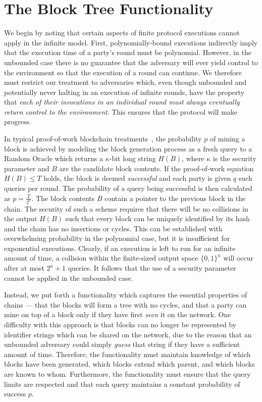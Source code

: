 \section{The Block Tree Functionality}\label{sec.functionality}

We begin by noting that certain aspects of finite protocol executions cannot
apply in the infinite model. First, polynomially-bound executions indirectly
imply that the execution time of a party's round must be polynomial. However, in
the unbounded case there is no guarantee that the adversary will ever yield
control to the environment so that the execution of a round can continue. We
therefore must restrict our treatment to adversaries which, even though
unbounded and potentially never halting in an execution of infinite rounds, have
the property that \emph{each of their invocations in an individual round must
always eventually return control to the environment}. This ensures that the
protocol will make progress.

In typical proof-of-work blockchain treatments~\cite{EC:GarKiaLeo15}, the
probability $p$ of mining a block is achieved by modeling the block generation
process as a fresh query to a Random Oracle which returns a $\kappa$-bit
long string $H(B)$, where $\kappa$ is the security parameter and $B$ are the
candidate block contents. If the proof-of-work equation $H(B) \leq T$ holds, the
block is deemed \emph{successful} and each party is given $q$ such queries per
round. The probability of a query being successful is then calculated as $p =
\frac{T}{2^\kappa}$. The block contents $B$ contain a pointer to the previous
block in the chain. The security of such a scheme requires that there will be
no collisions in the output $H(B)$ such that every block can be uniquely
identified by its hash and the chain has no insertions or cycles. This can be
established with overwhelming probability in the polynomial case, but it is
insufficient for exponential executions. Clearly, if an execution is left to run
for an infinite amount of time, a collision within the finite-sized output space
$\{0, 1\}^\kappa$ will occur after at most $2^\kappa + 1$ queries. It follows
that the use of a security parameter cannot be applied in the unbounded case.

Instead, we put forth a functionality which captures the essential properties of
chains --- that the blocks will form a tree with no cycles, and that a party can
mine on top of a block only if they have first \emph{seen} it on the network.
One difficulty with this approach is that blocks can no longer be represented by
identifier strings which can be shared on the network, due to the reason
that an unbounded adversary could simply \emph{guess} that string if they have
a sufficient amount of time. Therefore, the functionality must maintain
knowledge of which blocks have been generated, which blocks extend which parent,
and which blocks are known to whom. Furthermore, the functionality must ensure
that the query limits are respected and that each query maintains a constant
probability of success $p$.

